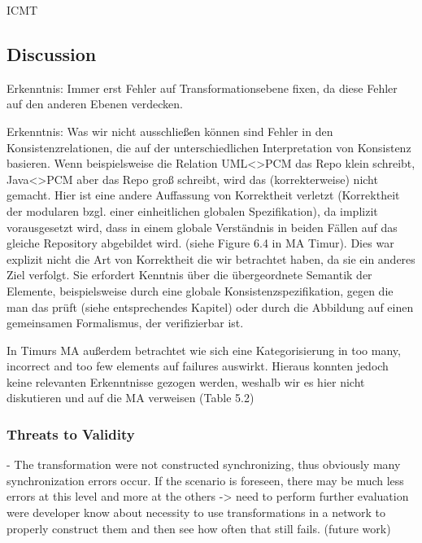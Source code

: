 \begin{copiedFrom}{ICMT}


\end{copiedFrom} %


\subsection{Discussion}

Erkenntnis: Immer erst Fehler auf Transformationsebene fixen, da diese Fehler auf den anderen Ebenen verdecken.

Erkenntnis: Was wir nicht ausschließen können sind Fehler in den Konsistenzrelationen, die auf der unterschiedlichen Interpretation von Konsistenz basieren. Wenn beispielsweise die Relation UML<>PCM das Repo klein schreibt, Java<>PCM aber das Repo groß schreibt, wird das (korrekterweise) nicht gemacht.
Hier ist eine andere Auffassung von Korrektheit verletzt (Korrektheit der modularen bzgl. einer einheitlichen globalen Spezifikation), da implizit vorausgesetzt wird, dass in einem globale Verständnis in beiden Fällen auf das gleiche Repository abgebildet wird. (siehe Figure 6.4 in MA Timur).
Dies war explizit nicht die Art von Korrektheit die wir betrachtet haben, da sie ein anderes Ziel verfolgt. Sie erfordert Kenntnis über die übergeordnete Semantik der Elemente, beispielsweise durch eine globale Konsistenzspezifikation, gegen die man das prüft (siehe entsprechendes Kapitel) oder durch die Abbildung auf einen gemeinsamen Formalismus, der verifizierbar ist.

In Timurs MA außerdem betrachtet wie sich eine Kategorisierung in too many, incorrect and too few elements auf failures auswirkt. Hieraus konnten jedoch keine relevanten Erkenntnisse gezogen werden, weshalb wir es hier nicht diskutieren und auf die MA verweisen (Table 5.2)


\subsubsection{Threats to Validity}
- The transformation were not constructed synchronizing, thus obviously many synchronization errors occur. If the scenario is foreseen, there may be much less errors at this level and more at the others -> need to perform further evaluation were developer know about necessity to use transformations in a network to properly construct them and then see how often that still fails. (future work)


